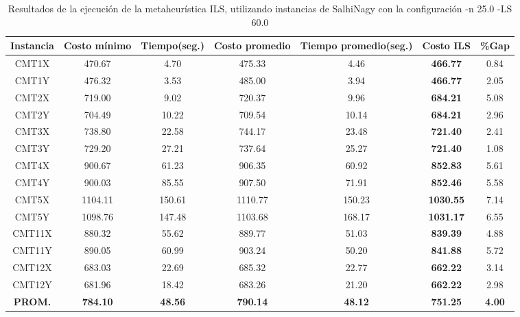 \begin{table}[ht]
\caption{Resultados de la ejecución de la metaheurística ILS, utilizando instancias de SalhiNagy con la configuración -n 25.0 -LS 60.0}
\centering
\small
\begin{tabular}{c c c c c c c}
\hline\hline
Instancia & Costo mínimo & Tiempo(seg.) & Costo promedio & Tiempo promedio(seg.) & Costo ILS & \%Gap \\ [0.5ex]
\hline
CMT1X & 470.67 & 4.70 & 
475.33 & 4.46 & \bf{466.77} & 
0.84\\CMT1Y & 476.32 & 3.53 & 
485.00 & 3.94 & \bf{466.77} & 
2.05\\CMT2X & 719.00 & 9.02 & 
720.37 & 9.96 & \bf{684.21} & 
5.08\\CMT2Y & 704.49 & 10.22 & 
709.54 & 10.14 & \bf{684.21} & 
2.96\\CMT3X & 738.80 & 22.58 & 
744.17 & 23.48 & \bf{721.40} & 
2.41\\CMT3Y & 729.20 & 27.21 & 
737.64 & 25.27 & \bf{721.40} & 
1.08\\CMT4X & 900.67 & 61.23 & 
906.35 & 60.92 & \bf{852.83} & 
5.61\\CMT4Y & 900.03 & 85.55 & 
907.50 & 71.91 & \bf{852.46} & 
5.58\\CMT5X & 1104.11 & 150.61 & 
1110.77 & 150.23 & \bf{1030.55} & 
7.14\\CMT5Y & 1098.76 & 147.48 & 
1103.68 & 168.17 & \bf{1031.17} & 
6.55\\CMT11X & 880.32 & 55.62 & 
889.77 & 51.03 & \bf{839.39} & 
4.88\\CMT11Y & 890.05 & 60.99 & 
903.24 & 50.20 & \bf{841.88} & 
5.72\\CMT12X & 683.03 & 22.69 & 
685.32 & 22.77 & \bf{662.22} & 
3.14\\CMT12Y & 681.96 & 18.42 & 
683.26 & 21.20 & \bf{662.22} & 
2.98\\\bf{PROM.} & 
\bf{784.10} & \bf{48.56} & \bf{790.14} & \bf{48.12} & \bf{751.25} & \bf{4.00}\\[1ex]\hline
\end{tabular}
\label{table:nonlin}
\end{table} \clearpage
